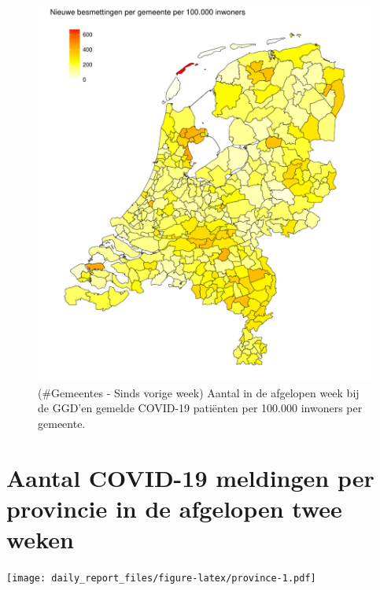 \documentclass[
  english,
  man,floatsintext]{apa6}
\begin{document}
\begin{figure}
\centering
\includegraphics{daily_report_files/figure-latex/Gemeentes - Sinds vorige week-1.pdf}
\caption{(\#Gemeentes - Sinds vorige week) Aantal in de afgelopen week bij de GGD'en gemelde COVID-19 patiënten per 100.000 inwoners per gemeente.}
\end{figure}

\newpage

\hypertarget{aantal-covid-19-meldingen-per-provincie-in-de-afgelopen-twee-weken}{%
\section{Aantal COVID-19 meldingen per provincie in de afgelopen twee weken}\label{aantal-covid-19-meldingen-per-provincie-in-de-afgelopen-twee-weken}}

\texttt{[image: daily\_report\_files/figure-latex/province-1.pdf]}
\end{document}
